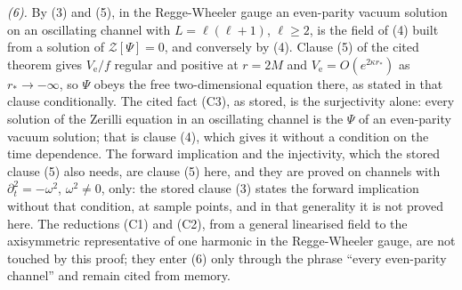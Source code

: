 \emph{(6).} By (3) and (5), in the Regge-Wheeler gauge an even-parity vacuum solution on an oscillating channel with $L = \ell(\ell+1)$, $\ell \geq 2$, is the field of (4) built from a solution of $\mathcal{Z}[\Psi] = 0$, and conversely by (4). Clause (5) of the cited theorem gives $V_{\mathrm{e}}/f$ regular and positive at $r = 2M$ and $V_{\mathrm{e}} = O(e^{2\kappa r_{*}})$ as $r_{*} \to -\infty$, so $\Psi$ obeys the free two-dimensional equation there, as stated in that clause conditionally. The cited fact (C3), as stored, is the surjectivity alone: every solution of the Zerilli equation in an oscillating channel is the $\Psi$ of an even-parity vacuum solution; that is clause (4), which gives it without a condition on the time dependence. The forward implication and the injectivity, which the stored clause (5) also needs, are clause (5) here, and they are proved on channels with $\partial_{t}^{2} = -\omega^{2}$, $\omega^{2} \neq 0$, only: the stored clause (3) states the forward implication without that condition, at sample points, and in that generality it is not proved here. The reductions (C1) and (C2), from a general linearised field to the axisymmetric representative of one harmonic in the Regge-Wheeler gauge, are not touched by this proof; they enter (6) only through the phrase ``every even-parity channel'' and remain cited from memory.
